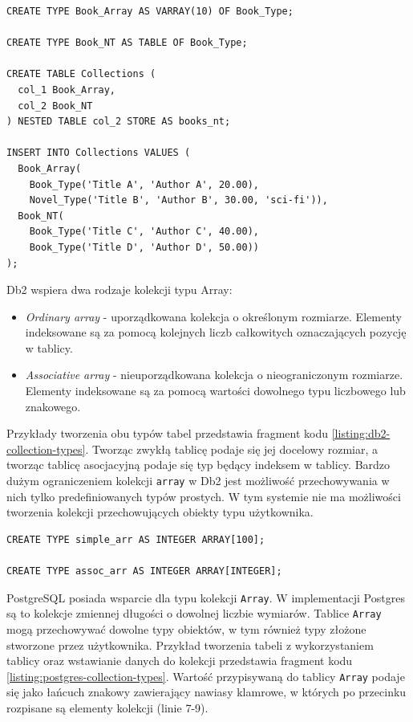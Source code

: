 \documentclass[a4paper,twoside,12pt]{book}
\begin{document}
\begin{lstlisting}[style=SQL, caption={Typy kolekcji w Oracle Database.}, label={listing:oracle-collection-types}, captionpos=b]
CREATE TYPE Book_Array AS VARRAY(10) OF Book_Type;

CREATE TYPE Book_NT AS TABLE OF Book_Type; 

CREATE TABLE Collections (
  col_1 Book_Array,
  col_2 Book_NT
) NESTED TABLE col_2 STORE AS books_nt;

INSERT INTO Collections VALUES (
  Book_Array(
    Book_Type('Title A', 'Author A', 20.00),
    Novel_Type('Title B', 'Author B', 30.00, 'sci-fi')),
  Book_NT(
    Book_Type('Title C', 'Author C', 40.00),
    Book_Type('Title D', 'Author D', 50.00))
);
\end{lstlisting}

Db2 wspiera dwa rodzaje kolekcji typu Array:
\begin{itemize}
\item \textit{Ordinary array} - uporządkowana kolekcja o określonym rozmiarze. Elementy indeksowane są za pomocą kolejnych liczb całkowitych oznaczających pozycję w tablicy. 
\item \textit{Associative array} - nieuporządkowana kolekcja o nieograniczonym rozmiarze. Elementy indeksowane są za pomocą wartości dowolnego typu liczbowego lub znakowego.
\end{itemize}

Przykłady tworzenia obu typów tabel przedstawia fragment kodu \ref{listing:db2-collection-types}. Tworząc zwykłą tablicę podaje się jej docelowy rozmiar, a tworząc tablicę asocjacyjną podaje się typ będący indeksem w tablicy. Bardzo dużym ograniczeniem kolekcji \lstinline{array} w Db2 jest możliwość przechowywania w nich tylko predefiniowanych typów prostych. W tym systemie nie ma możliwości tworzenia kolekcji przechowujących obiekty typu użytkownika.  

\begin{lstlisting}[style=SQL, caption={Typy kolekcji w IBM Db2.}, label={listing:db2-collection-types}, captionpos=b]
CREATE TYPE simple_arr AS INTEGER ARRAY[100];

CREATE TYPE assoc_arr AS INTEGER ARRAY[INTEGER];
\end{lstlisting}

PostgreSQL posiada wsparcie dla typu kolekcji \lstinline{Array}. W implementacji Postgres są to kolekcje zmiennej długości o dowolnej liczbie wymiarów. Tablice \lstinline{Array} mogą  przechowywać dowolne typy obiektów, w tym również typy złożone stworzone przez użytkownika. Przykład tworzenia tabeli z wykorzystaniem tablicy oraz wstawianie danych do kolekcji przedstawia fragment kodu \ref{listing:postgres-collection-types}. Wartość przypisywaną do tablicy \lstinline{Array} podaje się jako łańcuch znakowy zawierający nawiasy klamrowe, w których po przecinku rozpisane są elementy kolekcji (linie 7-9).
\end{document}
